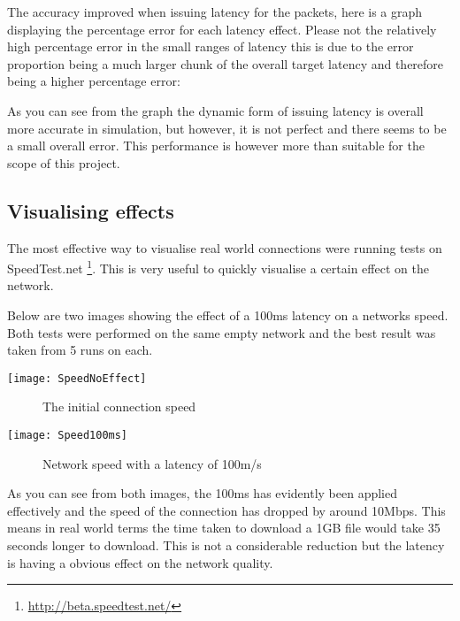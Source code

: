 The accuracy improved when issuing latency for the packets, here is a graph displaying the percentage error for each latency effect. Please not the relatively high percentage error in the small ranges of latency this is due to the error proportion being a much larger chunk of the overall target latency and therefore being a higher percentage error:



As you can see from the graph the dynamic form of issuing latency is overall more accurate in simulation, but however, it is not perfect and there seems to be a small overall error. This performance is however more than suitable for the scope of this project.

\subsection{Visualising effects}
The most effective way to visualise real world connections were running tests on SpeedTest.net \footnote{\url{http://beta.speedtest.net/}}. This is very useful to quickly visualise a certain effect on the network.

Below are two images showing the effect of a 100ms latency on a networks speed. Both tests were performed on the same empty network and the best result was taken from 5 runs on each.

\begin{center}
	\texttt{[image: SpeedNoEffect]}
	\begin{figure}[h]
		\caption{The initial connection speed}
	\end{figure}
\end{center}

\begin{center}
	\texttt{[image: Speed100ms]}
	\begin{figure}[h]
		\caption{Network speed with a latency of 100m/s}
	\end{figure}
\end{center}

As you can see from both images, the 100ms has evidently been applied effectively and the speed of the connection has dropped by around 10Mbps. This means in real world terms the time taken to download a 1GB file would take 35 seconds longer to download. This is not a considerable reduction but the latency is having a obvious effect on the network quality.


